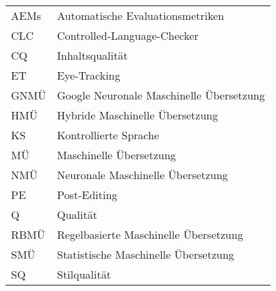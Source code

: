 \addchap{\lsAbbreviationsTitle}

\begin{tabularx}{\textwidth}{ll}
AEMs & Automatische Evaluationsmetriken\\
CLC & Controlled-Language-Checker \\
CQ & Inhaltsqualität\\
ET & Eye-Tracking\\
GNMÜ & Google Neuronale Maschinelle Übersetzung\\
HMÜ & Hybride Maschinelle Übersetzung\\
KS & Kontrollierte Sprache\\
MÜ & Maschinelle Übersetzung\\
NMÜ & Neuronale Maschinelle Übersetzung\\
PE & Post-Editing\\
Q & Qualität\\
RBMÜ & Regelbasierte Maschinelle Übersetzung\\
SMÜ & Statistische Maschinelle Übersetzung\\
SQ & Stilqualität\\
\end{tabularx}
